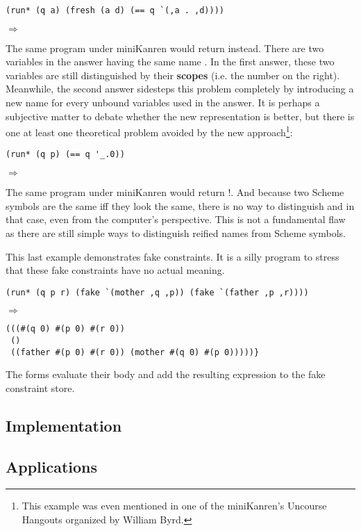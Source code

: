 \begin{lstlisting}
(run* (q a) (fresh (a d) (== q `(,a . ,d))))
\end{lstlisting}
$\Rightarrow$ 

The same program under miniKanren would return  instead. There are two variables in the answer having the same name . In the first answer, these two variables are still distinguished by their \textbf{scopes} (i.e. the number on the right). Meanwhile, the second answer sidesteps this problem completely by introducing a new name for every unbound variables used in the answer. It is perhaps a subjective matter to debate whether the new representation is better, but there is one at least one theoretical problem avoided by the new approach\footnote{This example was even mentioned in one of the miniKanren's Uncourse Hangouts organized by William Byrd.}:

\begin{lstlisting}
(run* (q p) (== q '_.0))
\end{lstlisting}
$\Rightarrow$ 

The same program under miniKanren would return !. And because two Scheme symbols are the same iff they look the same, there is no way to distinguish  and  in that case, even from the computer's perspective. This is not a fundamental flaw as there are still simple ways to distinguish reified names from Scheme symbols.

This last example demonstrates fake constraints. It is a silly program to stress that these fake constraints have no actual meaning.
\begin{lstlisting}
(run* (q p r) (fake `(mother ,q ,p)) (fake `(father ,p ,r))))
\end{lstlisting}

$\Rightarrow$
\begin{lstlisting}
(((#(q 0) #(p 0) #(r 0))
 ()
 ((father #(p 0) #(r 0)) (mother #(q 0) #(p 0)))))}
\end{lstlisting}

The  forms evaluate their body and add the resulting expression to the fake constraint store.

\subsection{Implementation}

\subsection{Applications}
